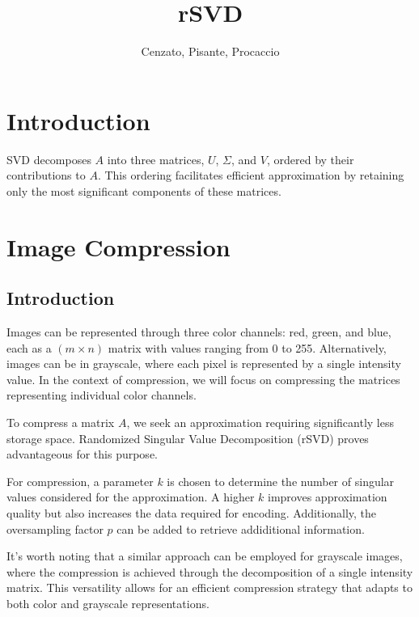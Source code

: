 \documentclass{article}
\title{rSVD}
\author{Cenzato, Pisante, Procaccio}
\begin{document}
\maketitle

\section{Introduction}
SVD decomposes $A$ into three matrices, $U$, $\Sigma$, and $V$, ordered by their contributions to $A$. This ordering facilitates efficient approximation by retaining only the most significant components of these matrices.



\newpage

\section{Image Compression}
\subsection{Introduction}
Images can be represented through three color channels: red, green, and blue, each as a $(m \times n)$ matrix with values ranging from 0 to 255. Alternatively, images can be in grayscale, where each pixel is represented by a single intensity value. In the context of compression, we will focus on compressing the matrices representing individual color channels.

To compress a matrix $A$, we seek an approximation requiring significantly less storage space. Randomized Singular Value Decomposition (rSVD) proves advantageous for this purpose. 

For compression, a parameter $k$ is chosen to determine the number of singular values considered for the approximation. A higher $k$ improves approximation quality but also increases the data required for encoding. Additionally, the oversampling factor $p$ can be added to retrieve addiditional information. 

It's worth noting that a similar approach can be employed for grayscale images, where the compression is achieved through the decomposition of a single intensity matrix. This versatility allows for an efficient compression strategy that adapts to both color and grayscale representations.
\end{document}
